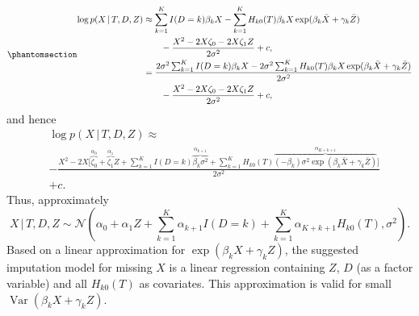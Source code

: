 \documentclass[
  letterpaper,
  paper=240mm:170mm,
  twoside=true,
  open=right,
  fontsize=10pt,
  pagesize=false,
  BCOR=15mm,
  DIV=14,
  headinclude=true,
  footinclude=false,
  headsepline=on]{scrbook}
\DeclareMathOperator{\Var}{Var}
\newcommand{\given}{\,|\,}
\begin{document}
\begin{equation}\phantomsection\label{eq-app-contin-lin}{
\begin{aligned}
    \log p(X \given T, D, Z) &\approx \sum^K_{k = 1} I(D=k) \beta_k X - \sum^K_{k = 1} H_{k0}(T) \beta_k X \exp(\beta_k \bar{X} + \gamma_k \bar{Z}) \\
    &\qquad - \frac{X^2 - 2X\zeta_0 - 2X\zeta_1 Z}{2\sigma^2} + c, \\
    &=  \frac{2\sigma^2\sum^K_{k = 1} I(D=k) \beta_k X - 2\sigma^2 \sum^K_{k = 1} H_{k0}(T) \beta_k X \exp(\beta_k \bar{X} + \gamma_k \bar{Z})}{2\sigma^2} \\
    &\qquad - \frac{X^2 - 2X\zeta_0 - 2X\zeta_1 Z}{2\sigma^2} + c,
\end{aligned}
}\end{equation} and hence \begin{align*}
    &\log p(X \given T, D, Z) \approx \\
    &- \frac{X^2 -2X\big[ \overbrace{\zeta_0}^{\alpha_0} + \overbrace{\zeta_1}^{\alpha_1} Z + \sum^K_{k = 1} I(D=k) \overbrace{\beta_k \sigma^2}^{\alpha_{k+1}} + \sum^K_{k = 1} H_{k0}(T) \overbrace{(-\beta_k) \sigma^2 \exp(\beta_k \bar{X} + \gamma_k \bar{Z})}^{\alpha_{K + k + 1}} \big]}{2\sigma^2} \\ &+ c.
\end{align*} Thus, approximately \begin{equation*}
    X \given T, D, Z \sim \mathcal{N}(\alpha_0 + \alpha_1 Z + \sum^K_{k = 1} \alpha_{k+1} I(D=k) + \sum^K_{k = 1} \alpha_{K + k + 1} H_{k0}(T),\sigma^2).
\end{equation*} Based on a linear approximation for
\(\exp(\beta_k X + \gamma_k Z)\), the suggested imputation model for
missing \(X\) is a linear regression containing \(Z\), \(D\) (as a
factor variable) and all \(H_{k0}(T)\) as covariates. This approximation
is valid for small \(\Var(\beta_k X + \gamma_k Z)\).
\end{document}

